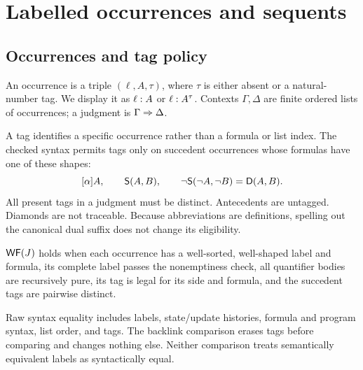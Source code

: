 \section{Labelled occurrences and sequents}\label{sec:sequents}

\subsection{Occurrences and tag policy}
An occurrence is a triple $(\ell,A,\tau)$, where $\tau$ is either absent or a
natural-number tag. We display it as $\ell:A$ or
$\ell:A^{\tau}$. Contexts $\Gamma,\Delta$ are finite ordered lists of
occurrences; a judgment is $\Gamma\Rightarrow \Delta$.

A tag identifies a specific occurrence rather than a formula or list index.
The checked syntax permits tags only on succedent occurrences whose formulas
have one of these shapes:
\[
 [\alpha]A,\qquad\mathsf{S}(A,B),\qquad
 \neg\mathsf{S}(\neg A,\neg B)=\mathsf{D}(A,B).
\]
All present tags in a judgment must be distinct. Antecedents are untagged.
Diamonds are not traceable. Because abbreviations are definitions, spelling
out the canonical dual suffix does not change its eligibility.

\begin{definition}
$\mathsf{WF}(J)$ holds when each occurrence has a well-sorted, well-shaped label and
formula, its complete label passes the nonemptiness check, all quantifier
bodies are recursively pure, its tag is legal for its side and formula, and
the succedent tags are pairwise distinct.
\end{definition}

Raw syntax equality includes labels, state/update histories, formula and
program syntax, list order, and tags. The backlink comparison erases tags
before comparing and changes nothing else. Neither comparison treats
semantically equivalent labels as syntactically equal.


